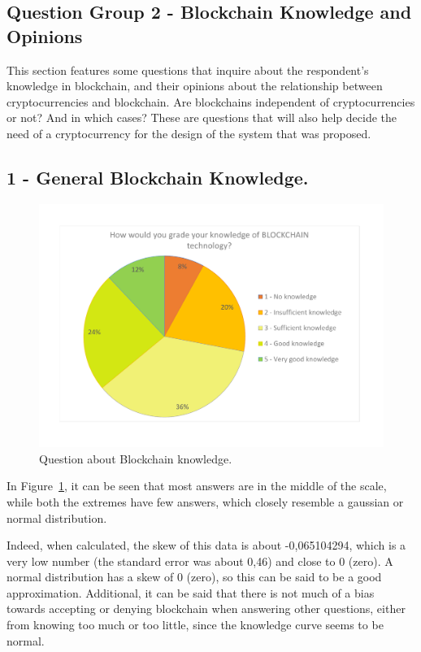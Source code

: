 \subsection{Question Group 2 - Blockchain Knowledge and Opinions}

This section features some questions that inquire about the respondent's knowledge in blockchain, and their opinions about the relationship between cryptocurrencies and blockchain. Are blockchains independent of cryptocurrencies or not? And in which cases? These are questions that will also help decide the need of a cryptocurrency for the design of the system that was proposed.

\subsection*{1 - General Blockchain Knowledge.}
 \begin{figure}[H]
\centering
\includegraphics[scale=0.40]{media/survey_group2/blockchain_knowledge.pdf}
\caption{Question about Blockchain knowledge.}
\label{fig:blockchain_knowledge}
\end{figure}

In Figure~\ref{fig:blockchain_knowledge}, it can be seen that most answers are in the middle of the scale, while both the extremes have few answers, which closely resemble a gaussian or normal distribution. 

Indeed, when calculated, the skew of this data is about -0,065104294, which is a very low number (the standard error was about 0,46) and close to 0 (zero). A normal distribution has a skew of 0 (zero), so this can be said to be a good approximation. Additional, it can be said that there is not much of a bias towards accepting or denying blockchain when answering other questions, either from knowing too much or too little, since the knowledge curve seems to be normal.
 
